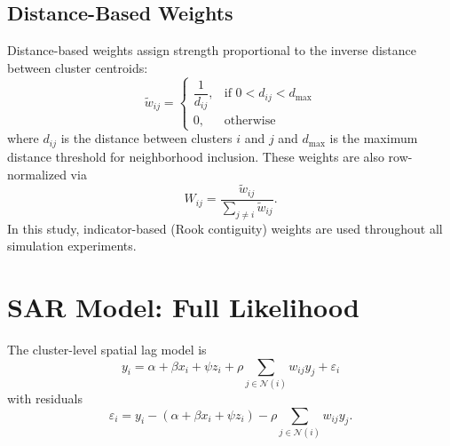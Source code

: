 \documentclass{article}[11pt]
\begin{document}
\subsection*{Distance-Based Weights}

Distance-based weights assign strength proportional to the inverse distance between cluster centroids:
\begin{equation*}
    \tilde{w}_{ij} =
    \begin{cases}
        \dfrac{1}{d_{ij}}, & \text{if } 0 < d_{ij} < d_{\max}\\[4pt]
        0, & \text{otherwise}
    \end{cases}
\end{equation*}
where $d_{ij}$ is the distance between clusters $i$ and $j$ and $d_{\max}$ is the maximum distance threshold for neighborhood inclusion. These weights are also row-normalized via
\begin{equation*}
    W_{ij} = \frac{\tilde{w}_{ij}}{\displaystyle\sum_{j \neq i}\tilde{w}_{ij}}.
\end{equation*}
In this study, indicator-based (Rook contiguity) weights are used throughout all simulation experiments.

\section{SAR Model: Full Likelihood}\label{appendix:SARLikelihood}

The cluster-level spatial lag model is
\begin{equation*}
    y_i = \alpha + \beta x_i + \psi z_i + \rho \sum_{j \in \mathcal{N}(i)} w_{ij} y_j + \varepsilon_i
\end{equation*}
with residuals
\begin{equation*}
    \varepsilon_i = y_i - \left(\alpha + \beta x_i + \psi z_i\right) - \rho \sum_{j \in \mathcal{N}(i)} w_{ij} y_j.
\end{equation*}
\end{document}
